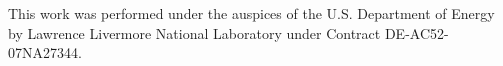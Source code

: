 This work was performed under the auspices of the U.S. Department of Energy by
Lawrence Livermore National Laboratory under Contract DE-AC52-07NA27344.

